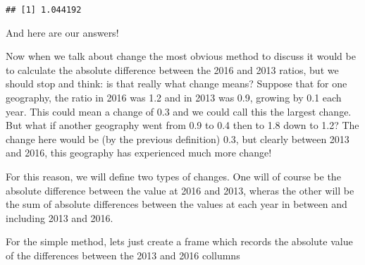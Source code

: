 \documentclass[]{article}
\newenvironment{Shaded}{\begin{snugshade}}{\end{snugshade}}
\newcommand{\KeywordTok}[1]{\textcolor[rgb]{0.13,0.29,0.53}{\textbf{#1}}}
\newcommand{\DecValTok}[1]{\textcolor[rgb]{0.00,0.00,0.81}{#1}}
\newcommand{\StringTok}[1]{\textcolor[rgb]{0.31,0.60,0.02}{#1}}
\newcommand{\CommentTok}[1]{\textcolor[rgb]{0.56,0.35,0.01}{\textit{#1}}}
\newcommand{\OperatorTok}[1]{\textcolor[rgb]{0.81,0.36,0.00}{\textbf{#1}}}
\newcommand{\NormalTok}[1]{#1}
\begin{document}
\begin{Shaded}
\end{Shaded}

\begin{verbatim}
## [1] 1.044192
\end{verbatim}

And here are our answers!

Now when we talk about change the most obvious method to discuss it
would be to calculate the absolute difference between the 2016 and 2013
ratios, but we should stop and think: is that really what change means?
Suppose that for one geography, the ratio in 2016 was 1.2 and in 2013
was 0.9, growing by 0.1 each year. This could mean a change of 0.3 and
we could call this the largest change. But what if another geography
went from 0.9 to 0.4 then to 1.8 down to 1.2? The change here would be
(by the previous definition) 0.3, but clearly between 2013 and 2016,
this geography has experienced much more change!

For this reason, we will define two types of changes. One will of course
be the absolute difference between the value at 2016 and 2013, wheras
the other will be the sum of absolute differences between the values at
each year in between and including 2013 and 2016.

For the simple method, lets just create a frame which records the
absolute value of the differences between the 2013 and 2016 collumns

\begin{Shaded}
\end{Shaded}
\end{document}
